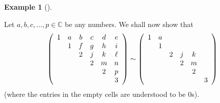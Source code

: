 \documentclass[numbers=enddot,12pt,final,onecolumn,notitlepage]{scrartcl}%
\numberwithin{exer}{subsection}
\theoremstyle{definition}
\newtheorem{exam}[theo]{Example}
\newenvironment{example}[1][]
{\begin{exam}[#1]\begin{leftbar}}
{\end{leftbar}\end{exam}}
\begin{document}
\begin{example}
\label{exa.jnf.step2}Let $a,b,c,\ldots,p\in\mathbb{C}$ be any numbers. We
shall now show that%
\begin{equation}
\left(
\begin{array}
[c]{cccccc}%
1 & a & b & c & d & e\\
& 1 & f & g & h & i\\
&  & 2 & j & k & \ell\\
&  &  & 2 & m & n\\
&  &  &  & 2 & p\\
&  &  &  &  & 3
\end{array}
\right)  \sim\left(
\begin{array}
[c]{cccccc}%
1 & a &  &  &  & \\
& 1 &  &  &  & \\
&  & 2 & j & k & \\
&  &  & 2 & m & \\
&  &  &  & 2 & \\
&  &  &  &  & 3
\end{array}
\right)  \label{eq.exa.jnf.step2.1}%
\end{equation}
(where the entries in the empty cells are understood to be $0$s).


\end{example}
\end{document}
